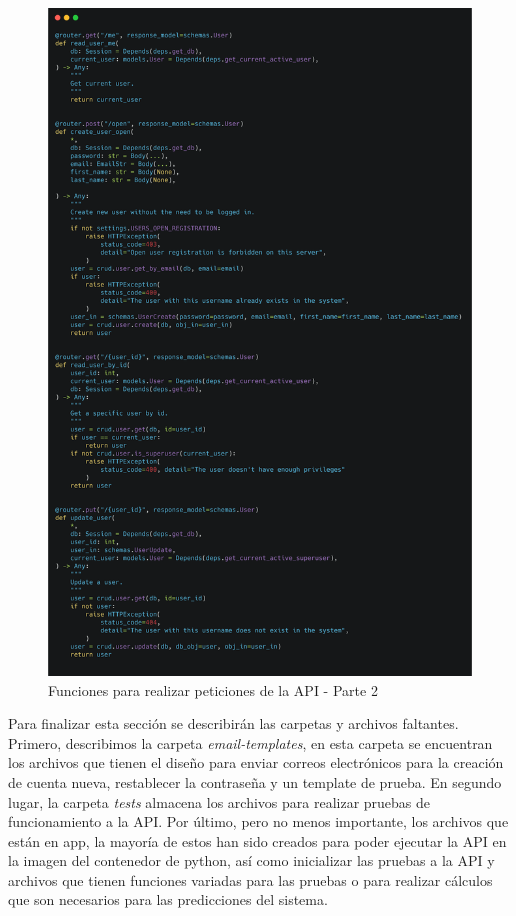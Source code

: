 \begin{figure}[!htb]
    \centering
    \includegraphics[scale=.10]{TT/img/implementacion/user_endpoint_2.png}
    \caption{Funciones para realizar peticiones de la API - Parte 2}
    \label{graphic:user_endpoint_2}    
\end{figure}

Para finalizar esta sección se describirán las carpetas y archivos faltantes. Primero, describimos la carpeta \textit{email-templates}, en esta carpeta se encuentran los archivos que tienen el diseño para enviar correos electrónicos para la creación de cuenta nueva, restablecer la contraseña y un template de prueba. En segundo lugar, la carpeta \textit{tests} almacena los archivos para realizar pruebas de funcionamiento a la API. Por último, pero no menos importante, los archivos que están en app, la mayoría de estos han sido creados para poder ejecutar la API en la imagen del contenedor de python, así como inicializar las pruebas a la API y archivos que tienen funciones variadas para las pruebas o para realizar cálculos que son necesarios para las predicciones del sistema.

